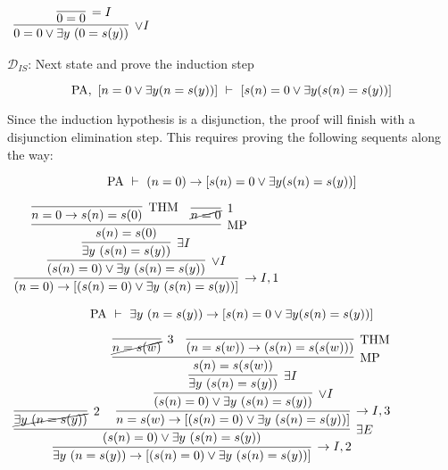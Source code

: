 \documentclass[11pt]{report}
\begin{document}
\begin{enumerate}
\begin{enumerate}
		\begin{mdframed}
			\begin{center}
				$\begin{array}{c}
					\infer[\lor I]{0=0 \lor \exists y \ (0 = s(y))}
						{\infer[=I]{0=0}	
							{}}
				\end{array}$
			\end{center}
		\end{mdframed}

		
		$\mathcal{D}_{IS}$: Next state and prove the induction step

		$$ \text{PA}, \ [n = 0 \lor \exists y (n = s(y))] \ \vdash \ [s(n) = 0 \lor \exists y (s(n) = s(y))]$$

		Since the induction hypothesis is a disjunction, the proof will finish with a disjunction elimination step. This requires proving the following sequents along the way: 

		$$ \text{PA} \ \vdash \ (n=0) \to [s(n) = 0 \lor \exists y (s(n) = s(y))]$$

		\begin{mdframed}
			\begin{center}
				$\begin{array}{c}
					\infer[\to I,1]{(n=0) \to [(s(n)=0) \lor \exists y \ (s(n)=s(y))]}
								{\infer[\lor I]{(s(n)=0) \lor \exists y \ (s(n)=s(y))}
									{\infer[\exists I]{\exists y \ (s(n)=s(y))}
										{\infer[\MP]{s(n)=s(0)}
											{\infer[\THM]{n=0 \to s(n)=s(0)}{}
											&
											\infer[1]{\cancel{n=0}}{}}}}}
				\end{array}$
			\end{center}
		\end{mdframed}

		$$ \text{PA} \ \vdash \ \exists y \ (n=s(y)) \to [s(n) = 0 \lor \exists y (s(n) = s(y))]$$

		\begin{mdframed}
			\begin{center}
				$\begin{array}{c}
					\infer[\to I,2]{\exists y \ (n=s(y)) \to [(s(n)=0) \lor \exists y \ (s(n)=s(y))]}
								{\infer[\exists E]{(s(n)=0) \lor \exists y \ (s(n)=s(y))}
									{\infer[2]{\cancel{\exists y \ (n=s(y))}}{}
									&
									\infer[\to I,3]{n=s(w) \to [(s(n)=0) \lor \exists y \ (s(n)=s(y))]}
										{\infer[\lor I]{(s(n)=0) \lor \exists y \ (s(n)=s(y))}
											{\infer[\exists I]{\exists y \ (s(n)=s(y))}
												{\infer[\MP]{s(n)=s(s(w))}
													{\infer[3]{\cancel{n=s(w)}}{}
													&
													\infer[\THM]{(n=s(w)) \to (s(n)=s(s(w)))}
														{}
													}}}}}}
				\end{array}$
			\end{center}
		\end{mdframed}


\end{enumerate}
\end{enumerate}
\end{document}
